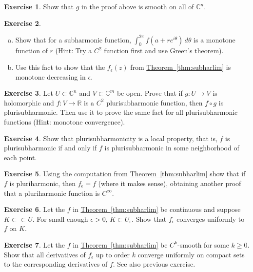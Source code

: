 \documentclass[12pt,openany]{book}
\newcommand{\C}{{\mathbb{C}}}
\newcommand{\R}{{\mathbb{R}}}
\theoremstyle{plain}
\theoremstyle{remark}
\theoremstyle{definition}
\newenvironment{exbox}{%
    \def\FrameCommand{\vrule width 1pt \relax\hspace{10pt}}%
    \MakeFramed {\advance \hsize -\width \FrameRestore}%
}{%
    \endMakeFramed
}
\newenvironment{exparts}{%
    \leavevmode\begin{enumerate}[a),noitemsep,topsep=0pt,parsep=0pt,partopsep=0pt]
}{%
    \end{enumerate}
}
\theoremstyle{exercise}
\newtheorem{exercise}{Exercise}[section]
\theoremstyle{example}
\newcommand{\thmref}[1]{\hyperref[#1]{Theorem~\ref*{#1}}}
\begin{document}
\begin{exbox}
\begin{exercise}
Show that $g$ in the proof above is smooth on all of $\C^n$.
\end{exercise}

\begin{exercise}
\begin{exparts}
\item
Show that for a subharmonic function, $\int_0^{2\pi} f(a+re^{i\theta}) \,
d\theta$ is a monotone function of $r$ (Hint: Try a $C^2$ function first and
use Green's theorem).
\item
Use this
fact to show that the $f_\epsilon(z)$ from \thmref{thm:subharlim} is monotone
decreasing in $\epsilon$.
\end{exparts}
\end{exercise}

\begin{exercise}
Let $U \subset \C^n$
and $V \subset \C^m$ be open.
Prove that
if $g \colon U \to V$ is holomorphic and $f
\colon V \to \R$ is a $C^2$ plurisubharmonic function, then 
$f \circ g$ is plurisubharmonic.
Then use it to prove the same fact
for all plurisubharmonic functions (Hint: monotone convergence).
\end{exercise}

\begin{exercise}
Show that plurisubharmonicity is a local property, that is,
$f$ is plurisubharmonic if and only if $f$ is plurisubharmonic in
some neighborhood of each point.
\end{exercise}

\begin{exercise}
Using the computation from
\thmref{thm:subharlim} show that if $f$ is pluriharmonic, then
$f_\epsilon = f$ (where it makes sense), obtaining another proof that 
a pluriharmonic function is $C^\infty$.
\end{exercise}

\begin{exercise}
Let the $f$ in \thmref{thm:subharlim} be continuous and suppose $K \subset
\subset U$.  For small enough $\epsilon >0$, $K \subset U_\epsilon$.
Show that $f_\epsilon$ converges uniformly to $f$ on $K$.
\end{exercise}

\begin{exercise}
Let the $f$ in \thmref{thm:subharlim} be $C^k$-smooth for some $k \geq 0$.
Show that all derivatives of $f_\epsilon$ up to order $k$ converge uniformly
on compact sets to the corresponding derivatives of $f$.  See also previous
exercise.
\end{exercise}
\end{exbox}
\end{document}
